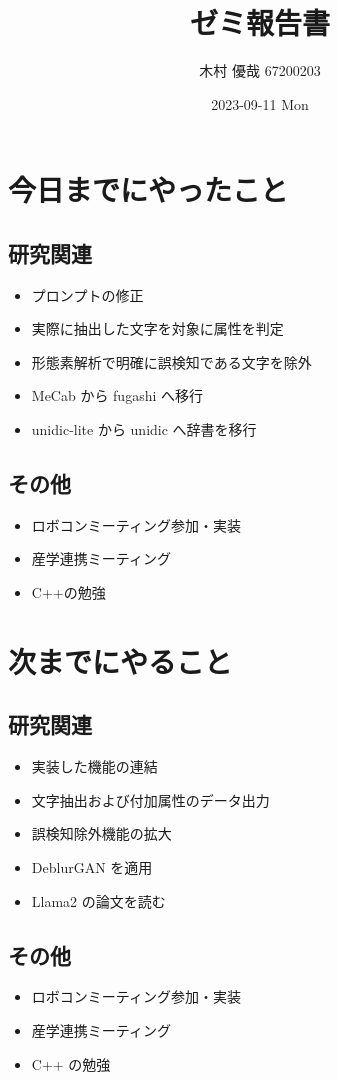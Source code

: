 \documentclass[uplatex, onecolumn, 10pt]{jsarticle}
\begin{document}
\title{\vspace{-40mm}\bf{\LARGE{ゼミ報告書}}}
\author{\vspace{-40mm}木村 優哉 67200203}
\date{2023-09-11 Mon}
\maketitle


\section{今日までにやったこと}

\subsection*{研究関連}
\begin{itemize}
	\item プロンプトの修正
	\item 実際に抽出した文字を対象に属性を判定
	\item 形態素解析で明確に誤検知である文字を除外
	\item MeCab から fugashi へ移行
	\item unidic-lite から unidic へ辞書を移行
\end{itemize}

\subsection*{その他}
\begin{itemize}
	\item ロボコンミーティング参加・実装
	\item 産学連携ミーティング
	\item C++の勉強
\end{itemize}


\section{次までにやること}

\subsection*{研究関連}
\begin{itemize}
	\item 実装した機能の連結
	\item 文字抽出および付加属性のデータ出力
	\item 誤検知除外機能の拡大
	\item DeblurGAN を適用
	\item Llama2 の論文を読む
\end{itemize}

\subsection*{その他}
\begin{itemize}
	\item ロボコンミーティング参加・実装
	\item 産学連携ミーティング
	\item C++ の勉強
\end{itemize}
\end{document}
